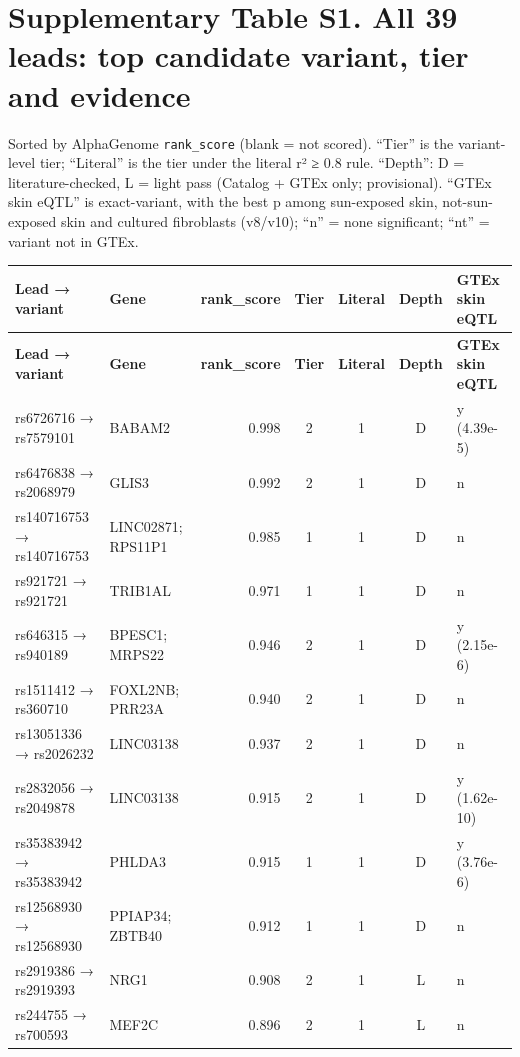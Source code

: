 \documentclass[10pt,twocolumn,a4paper]{article}
\begin{document}
\clearpage\onecolumn
\section*{Supplementary Table S1. All 39 leads: top candidate variant, tier and evidence}
Sorted by AlphaGenome \texttt{rank\_score} (blank = not scored). ``Tier'' is the variant-level tier; ``Literal'' is the tier under the literal r² ≥ 0.8 rule. ``Depth'': D = literature-checked, L = light pass (Catalog + GTEx only; provisional). ``GTEx skin eQTL'' is exact-variant, with the best p among sun-exposed skin, not-sun-exposed skin and cultured fibroblasts (v8/v10); ``n'' = none significant; ``nt'' = variant not in GTEx.
\medskip
{\footnotesize\setlength{\tabcolsep}{4pt}\renewcommand{\arraystretch}{1.12}
\begin{longtable}{@{}l>{\raggedright\arraybackslash}p{5.2cm}rcccl@{}}
\toprule
\textbf{Lead → variant} & \textbf{Gene} & \textbf{rank\_score} & \textbf{Tier} & \textbf{Literal} & \textbf{Depth} & \textbf{GTEx skin eQTL} \\
\midrule
\endfirsthead
\toprule
\textbf{Lead → variant} & \textbf{Gene} & \textbf{rank\_score} & \textbf{Tier} & \textbf{Literal} & \textbf{Depth} & \textbf{GTEx skin eQTL} \\
\midrule
\endhead
\bottomrule
\endfoot
rs6726716 → rs7579101 & BABAM2 & 0.998 & 2 & 1 & D & y (4.39e-5) \\
rs6476838 → rs2068979 & GLIS3 & 0.992 & 2 & 1 & D & n \\
rs140716753 → rs140716753 & LINC02871; RPS11P1 & 0.985 & 1 & 1 & D & n \\
rs921721 → rs921721 & TRIB1AL & 0.971 & 1 & 1 & D & n \\
rs646315 → rs940189 & BPESC1; MRPS22 & 0.946 & 2 & 1 & D & y (2.15e-6) \\
rs1511412 → rs360710 & FOXL2NB; PRR23A & 0.940 & 2 & 1 & D & n \\
rs13051336 → rs2026232 & LINC03138 & 0.937 & 2 & 1 & D & n \\
rs2832056 → rs2049878 & LINC03138 & 0.915 & 2 & 1 & D & y (1.62e-10) \\
rs35383942 → rs35383942 & PHLDA3 & 0.915 & 1 & 1 & D & y (3.76e-6) \\
rs12568930 → rs12568930 & PPIAP34; ZBTB40 & 0.912 & 1 & 1 & D & n \\
rs2919386 → rs2919393 & NRG1 & 0.908 & 2 & 1 & L & n \\
rs244755 → rs700593 & MEF2C & 0.896 & 2 & 1 & L & n \\

\end{longtable}}
\end{document}
